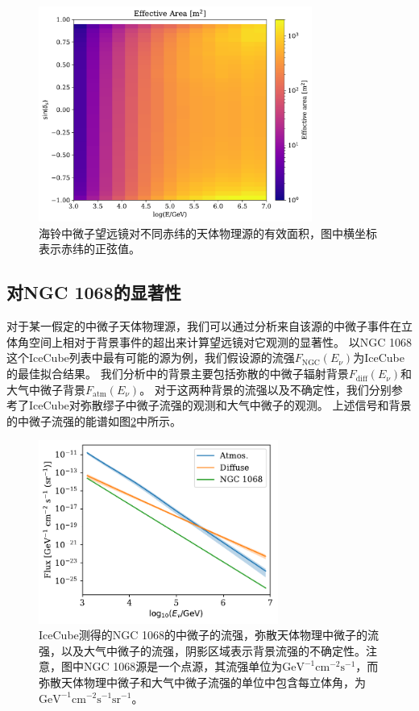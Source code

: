 \begin{figure}[!htb]%
    \centering
    \includegraphics[width=0.80\textwidth]{img/eff_area_with_lat.pdf}
    \caption{海铃中微子望远镜对不同赤纬的天体物理源的有效面积，图中横坐标表示赤纬的正弦值。}
    \label{fig:eff_area_with_lat}
\end{figure}



\subsection{对NGC 1068的显著性}

对于某一假定的中微子天体物理源，我们可以通过分析来自该源的中微子事件在立体角空间上相对于背景事件的超出来计算望远镜对它观测的显著性。
以NGC 1068这个IceCube列表中最有可能的源为例，我们假设源的流强$F_\mathrm{NGC}(E_\nu)$为IceCube的最佳拟合结果\cite{IceCube_NGC1068:2022}。
我们分析中的背景主要包括弥散的中微子辐射背景$F_\mathrm{diff}(E_\nu)$和大气中微子背景$F_\mathrm{atm}(E_\nu)$。
对于这两种背景的流强以及不确定性，我们分别参考了IceCube对弥散缪子中微子流强的观测\cite{IceCube_diffse_muon:2021}和大气中微子的观测\cite{IceCube_atmos_nu:2014}。
上述信号和背景的中微子流强的能谱如图\ref{fig:source_background_flux}中所示。

\begin{figure}[!htb]%
    \centering
    \includegraphics[width=0.70\textwidth]{img/source_background_flux.pdf}
    \caption{IceCube测得的NGC 1068的中微子的流强，弥散天体物理中微子的流强，以及大气中微子的流强，阴影区域表示背景流强的不确定性。注意，图中NGC 1068源是一个点源，其流强单位为$\mathrm{GeV^{-1} cm^{-2} s^{-1}}$，而弥散天体物理中微子和大气中微子流强的单位中包含每立体角，为$\mathrm{GeV^{-1} cm^{-2} s^{-1} sr^{-1}}$。}
    \label{fig:source_background_flux}
\end{figure}

